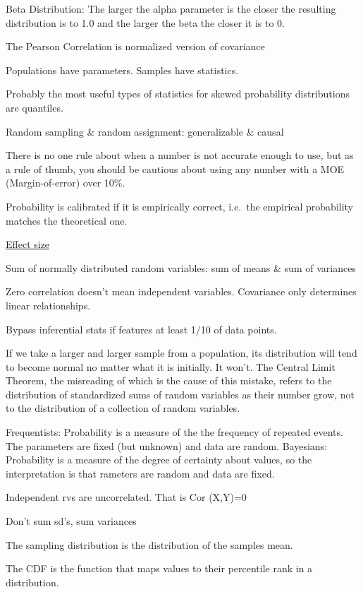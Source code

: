 \documentclass[]{book}
\begin{document}
Beta Distribution: The larger the alpha parameter is the closer the resulting distribution is to 1.0 and the larger the beta the closer it is to 0.

The Pearson Correlation is normalized version of covariance

Populations have parameters. Samples have statistics.

Probably the most useful types of statistics for skewed probability distributions are quantiles.

Random sampling \& random assignment: generalizable \& causal

There is no one rule about when a number is not accurate enough to use, but as a rule of thumb, you should be cautious about using any number with a MOE (Margin-of-error) over 10\%.

Probability is calibrated if it is empirically correct, i.e.~the empirical probability matches the theoretical one.

\href{https://artax.karlin.mff.cuni.cz/r-help/library/lsr/html/cohensD.html}{Effect size}

Sum of normally distributed random variables: sum of means \& sum of variances

Zero correlation doesn't mean independent variables. Covariance only determines linear relationships.

Bypass inferential stats if features at least 1/10 of data points.

If we take a larger and larger sample from a population, its distribution will tend to become normal no matter what it is initially. It won't. The Central Limit Theorem, the misreading of which is the cause of this mistake, refers to the distribution of standardized sums of random variables as their number grow, not to the distribution of a collection of random variables.

Frequentists: Probability is a measure of the the frequency of repeated events. The parameters are fixed (but unknown) and data are random. Bayesians: Probability is a measure of the degree of certainty about values, so the interpretation is that rameters are random and data are fixed.

Independent rvs are uncorrelated. That is Cor (X,Y)=0

Don't sum sd's, sum variances

The sampling distribution is the distribution of the samples mean.

The CDF is the function that maps values to their percentile rank in a distribution.
\end{document}
